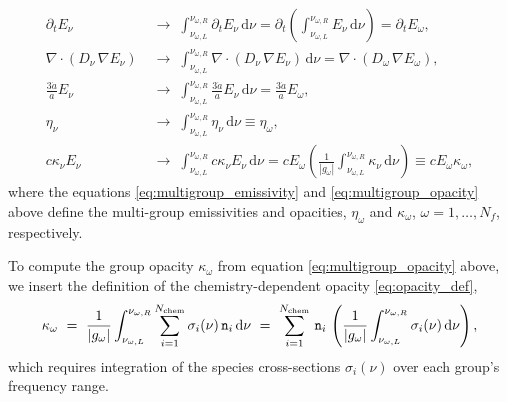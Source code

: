 \documentclass[10pt]{article}
\renewcommand{\(}{\left(}
\renewcommand{\)}{\right)}
\newcommand{\adot}{\dot{a}}
\newcommand{\Enu}{E_{\nu}}
\newcommand{\mn}{{\tt n}}
\begin{document}
\begin{align}
 \label{eq:multigroup_timederivative}
   \partial_{t} \Enu &\;\rightarrow\;
   \int_{\nu_{\omega,L}}^{\nu_{\omega,R}} \partial_{t} \Enu\,\mathrm d\nu
   =
   \partial_t\left( \int_{\nu_{\omega,L}}^{\nu_{\omega,R}} \Enu\,\mathrm d\nu\right)
   =
   \partial_{t} E_{\omega}, \\
 \label{eq:multigroup_diffusion}
   \nabla\cdot(D_{\nu}\,\nabla\Enu) &\;\rightarrow\;
   \int_{\nu_{\omega,L}}^{\nu_{\omega,R}} \nabla\cdot(D_{\nu}\,\nabla\Enu)\,\mathrm d\nu
   =
   \nabla\cdot(D_{\omega}\,\nabla E_{\omega}), \\
 \label{eq:multigroup_depletion}
   \frac{3 \adot}{a} \Enu &\;\rightarrow\;
   \int_{\nu_{\omega,L}}^{\nu_{\omega,R}} \frac{3 \adot}{a} \Enu\,\mathrm d\nu
   =
   \frac{3 \adot}{a} E_{\omega}, \\
 \label{eq:multigroup_emissivity}
   \eta_{\nu} &\;\rightarrow\;
   \int_{\nu_{\omega,L}}^{\nu_{\omega,R}} \eta_{\nu}\,\mathrm d\nu
   \equiv
   \eta_{\omega}, \\
 \label{eq:multigroup_opacity}
   c \kappa_{\nu} \Enu &\;\rightarrow\;
   \int_{\nu_{\omega,L}}^{\nu_{\omega,R}} c \kappa_{\nu} \Enu\,\mathrm d\nu
   =
   c E_{\omega}\left(\frac{1}{|g_{\omega}|} \int_{\nu_{\omega,L}}^{\nu_{\omega,R}} \kappa_{\nu}\,\mathrm d\nu\right)
   \equiv
   c E_{\omega} \kappa_{\omega},
\end{align}
where the equations \eqref{eq:multigroup_emissivity} and
\eqref{eq:multigroup_opacity} above define the multi-group emissivities
and opacities, $\eta_{\omega}$ and $\kappa_{\omega}$,
$\omega=1,\ldots,N_f$, respectively.

To compute the group opacity $\kappa_{\omega}$ from equation
\eqref{eq:multigroup_opacity} above, we insert the definition of the
chemistry-dependent opacity \eqref{eq:opacity_def},
\begin{align}
\label{eq:multigroup_opacity_calculation}
   \kappa_{\omega} \ = \ \frac{1}{|g_{\omega}|}
   \int_{\nu_{\omega,L}}^{\nu_{\omega,R}} \sum_{i=1}^{N_\text{chem}}
   \sigma_{i}(\nu)\,\mn_i\,\mathrm d\nu \ = \
   \sum_{i=1}^{N_\text{chem}}\,\mn_i\,
   \left(\frac{1}{|g_{\omega}|} \int_{\nu_{\omega,L}}^{\nu_{\omega,R}} 
   \sigma_{i}(\nu)\,\mathrm d\nu\right),
\end{align}
which requires integration of the species cross-sections
$\sigma_{i}(\nu)$ over each group's frequency range. 
\end{document}
